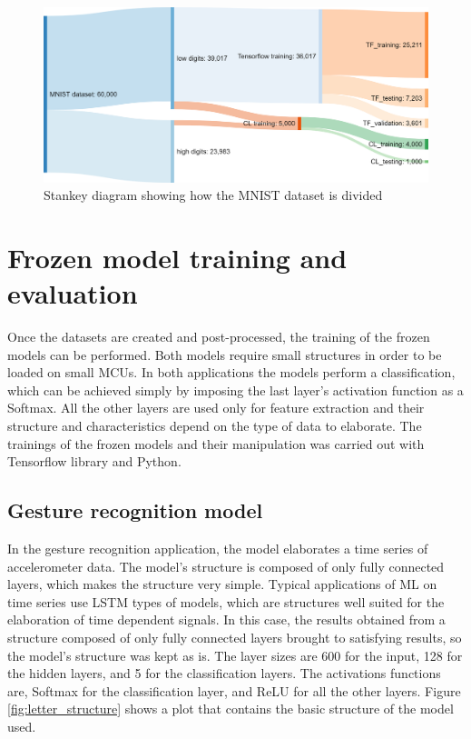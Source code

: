 \documentclass[12pt]{report}
\begin{document}
\begin{figure}[h!]
    \centering
    \includegraphics[width=120mm]{Figures/Chapter4/flow_dataset_openmv.png} 
    \caption{Stankey diagram showing how the MNIST dataset is divided}
    \label{fig:flow_dataset_openmv}    
\end{figure}

\section{Frozen model training and evaluation}
Once the datasets are created and post-processed, the training of the frozen models can be performed. Both models require small structures in order to be loaded on small MCUs. In both applications the models perform a classification, which can be achieved simply by imposing the last layer's activation function as a Softmax. All the other layers are used only for feature extraction and their structure and characteristics depend on the type of data to elaborate.
The trainings of the frozen models and their manipulation was carried out with Tensorflow library and Python.\\

\subsection{Gesture recognition model}
In the gesture recognition application, the model elaborates a time series of accelerometer data. The model's structure is composed of only fully connected layers, which makes the structure very simple. Typical applications of ML on time series use LSTM types of models, which are structures well suited for the elaboration of time dependent signals. In this case, the results obtained from a structure composed of only fully connected layers brought to satisfying results, so the model's structure was kept as is. The layer sizes are 600 for the input, 128 for the hidden layers, and 5 for the classification layers. The activations functions are, Softmax for the classification layer, and ReLU for all the other layers. Figure \ref{fig:letter_structure} shows a plot that contains the basic structure of the model used.\\
\end{document}
